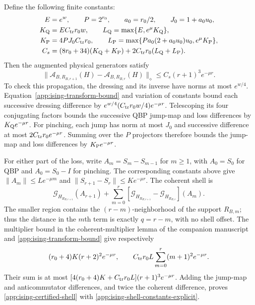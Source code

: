 \documentclass[11pt,a4paper]{article}
\theoremstyle{remark}
\begin{document}
Define the following finite constants:
\begin{align}
 E&=e^w,\qquad P=2^{r_0},\qquad a_0=r_0/2,\qquad J_0=1+a_0u_0,\notag\\
 K_{\rm Q}&=E C_{\rm tr}r_0w,\qquad
 L_{\rm Q}=\max\{E,e^\mu K_{\rm Q}\},\notag\\
 K_{\rm P}&=4PJ_0C_{\rm tr}r_0,\qquad
 L_{\rm P}=\max\{Pa_0(2+a_0u_0)u_0,e^\mu K_{\rm P}\},\notag\\
 C_s&=(8r_0+34)(K_{\rm Q}+K_{\rm P})
       +2C_{\rm tr}r_0(L_{\rm Q}+L_{\rm P}).
 \label{app:ising-shell-constants-explicit}
\end{align}
Then the augmented physical generators satisfy
\begin{equation}
 \|\mathcal A_{B,R_{B,r+1}}(H)-\mathcal A_{B,R_{B,r}}(H)\|_\diamond
 \le C_s(r+1)^3e^{-\mu r}.
 \label{app:ising-certified-shell}
\end{equation}
To check this propagation, the dressing and its inverse have norms at
most $e^{w/4}$. Equation~\eqref{app:ising-transform-bound} and variation
of constants bound each successive dressing difference by
$e^{w/4}(C_{\rm tr}r_0w/4)e^{-\mu r}$.
Telescoping its four conjugating factors bounds the successive QBP
jump-map and loss differences by $K_{\rm Q}e^{-\mu r}$.
For pinching, each jump has norm at most $J_0$ and successive difference
at most $2C_{\rm tr}r_0e^{-\mu r}$. Summing over the $P$ projectors
therefore bounds the jump-map and loss differences by
$K_{\rm P}e^{-\mu r}$.

For either part of the loss, write $A_m=S_m-S_{m-1}$ for $m\ge1$,
with $A_0=S_0$ for QBP and $A_0=S_0-I$ for pinching.
The corresponding constants above give
$\|A_m\|\le L e^{-\mu m}$ and
$\|S_{r+1}-S_r\|\le K e^{-\mu r}$.
The coherent shell is
\[
 \mathcal G_{H_{R_{B,r+1}}}(A_{r+1})
 +\sum_{m=0}^r
 [\mathcal G_{H_{R_{B,r+1}}}-\mathcal G_{H_{R_{B,r}}}](A_m).
\]
The smaller region contains the $(r-m)$-neighborhood of the support
$R_{B,m}$; thus the distance in the $m$th term is exactly $q=r-m$,
with no shell offset. The multiplier bound in the coherent-multiplier lemma of the companion manuscript
and \eqref{app:ising-transform-bound} give respectively
\[
 (r_0+4)K(r+2)^2e^{-\mu r},\qquad
 C_{\rm tr}r_0L\sum_{m=0}^r(m+1)^2e^{-\mu r}.
\]
Their sum is at most
$[4(r_0+4)K+C_{\rm tr}r_0L](r+1)^3e^{-\mu r}$.
Adding the jump-map and anticommutator differences, and twice the
coherent difference, proves \eqref{app:ising-certified-shell} with
\eqref{app:ising-shell-constants-explicit}.
\end{document}
